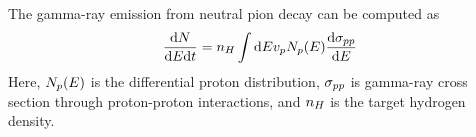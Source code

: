 The gamma-ray emission from neutral pion decay can be computed
as
\begin{equation}
  \frac{\text{d}N}{\text{d}E\text{d}t} = 
  n_H \int \text{d}E v_p N_p(E) 
  \frac{\text{d}\sigma_{pp}}{\text{d}E}
\end{equation}
Here, $N_p(E)$ is the differential proton
distribution,
$\sigma_{pp}$ is gamma-ray cross section through proton-proton interactions,
and $n_H$ is the target hydrogen density.



